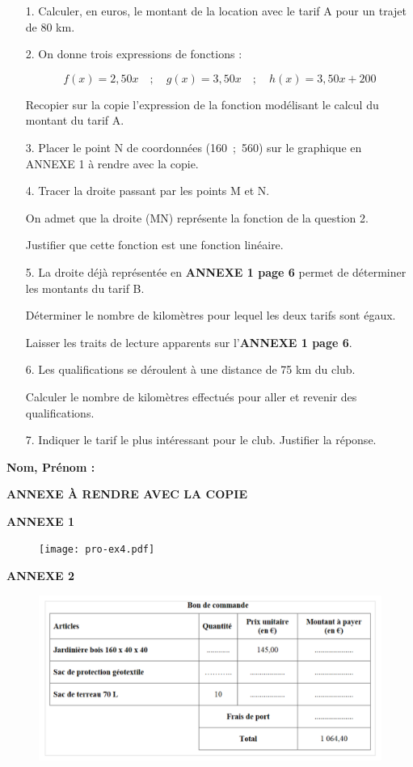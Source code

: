 \medskip

\begin{enumerate}
  \item[1.] Calculer, en euros, le montant de la location avec le tarif A pour un trajet de 80 km. 
  \item[2.] On donne trois expressions de fonctions : 

  \[f(x) = 2,50 x \quad ; \quad g(x) = 3,50 x \quad;\quad h(x) = 3,50 x + 200\]

  Recopier sur la copie l'expression de la fonction modélisant le calcul du montant du tarif A.

  \item[3.] Placer le point N de coordonnées (160~;~560) sur le graphique en ANNEXE 1 à rendre avec la copie. 

  \item[4.] Tracer la droite passant par les points M et N. 

  On admet que la droite (MN) représente la fonction de la question 2. 

  Justifier que cette fonction est une fonction linéaire. 

  \item [5.] La droite déjà représentée en \textbf{ANNEXE 1 page 6} permet de déterminer les montants du tarif B. 

  Déterminer le nombre de kilomètres pour lequel les deux tarifs sont égaux. 

  Laisser les traits de lecture apparents sur l'\textbf{ANNEXE 1 page 6}. 

  \item[6.] Les qualifications se déroulent à une distance de 75 km du club. 

  Calculer le nombre de kilomètres effectués pour aller et revenir des qualifications. 

  \item[7.] Indiquer le tarif le plus intéressant pour le club. Justifier la réponse.
\end{enumerate}


\newpage
\textbf{Nom, Prénom : } \dotfill
\medskip \medskip

\begin{center}\textbf{ANNEXE À RENDRE AVEC LA COPIE} \end{center}




\textbf{ANNEXE 1} \\
\begin{figure}[H]
  \centering
  \texttt{[image: pro-ex4.pdf]}
\end{figure}

\textbf{ANNEXE 2} \\
\begin{figure}[H]
  \centering
  \includegraphics[width=0.7\linewidth]{pro-ex5.png}
\end{figure}


